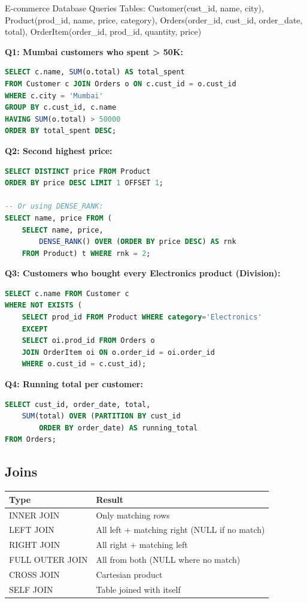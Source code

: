 \documentclass[12pt,a4paper]{article}
\begin{document}
\begin{examplebox}{E-commerce Database Queries}
Tables: Customer(cust\_id, name, city), Product(prod\_id, name, price, category), Orders(order\_id, cust\_id, order\_date, total), OrderItem(order\_id, prod\_id, quantity, price)

\textbf{Q1: Mumbai customers who spent > 50K:}
\begin{lstlisting}[language=SQL]
SELECT c.name, SUM(o.total) AS total_spent
FROM Customer c JOIN Orders o ON c.cust_id = o.cust_id
WHERE c.city = 'Mumbai'
GROUP BY c.cust_id, c.name
HAVING SUM(o.total) > 50000
ORDER BY total_spent DESC;
\end{lstlisting}

\textbf{Q2: Second highest price:}
\begin{lstlisting}[language=SQL]
SELECT DISTINCT price FROM Product
ORDER BY price DESC LIMIT 1 OFFSET 1;

-- Or using DENSE_RANK:
SELECT name, price FROM (
    SELECT name, price,
        DENSE_RANK() OVER (ORDER BY price DESC) AS rnk
    FROM Product) t WHERE rnk = 2;
\end{lstlisting}

\textbf{Q3: Customers who bought every Electronics product (Division):}
\begin{lstlisting}[language=SQL]
SELECT c.name FROM Customer c
WHERE NOT EXISTS (
    SELECT prod_id FROM Product WHERE category='Electronics'
    EXCEPT
    SELECT oi.prod_id FROM Orders o
    JOIN OrderItem oi ON o.order_id = oi.order_id
    WHERE o.cust_id = c.cust_id);
\end{lstlisting}

\textbf{Q4: Running total per customer:}
\begin{lstlisting}[language=SQL]
SELECT cust_id, order_date, total,
    SUM(total) OVER (PARTITION BY cust_id
        ORDER BY order_date) AS running_total
FROM Orders;
\end{lstlisting}
\end{examplebox}

\subsection{Joins}
\begin{center}
\begin{tabular}{@{}l p{8cm}@{}}
\toprule
\textbf{Type} & \textbf{Result} \\
\midrule
INNER JOIN & Only matching rows \\
LEFT JOIN & All left + matching right (NULL if no match) \\
RIGHT JOIN & All right + matching left \\
FULL OUTER JOIN & All from both (NULL where no match) \\
CROSS JOIN & Cartesian product \\
SELF JOIN & Table joined with itself \\
\bottomrule
\end{tabular}
\end{center}
\end{document}

